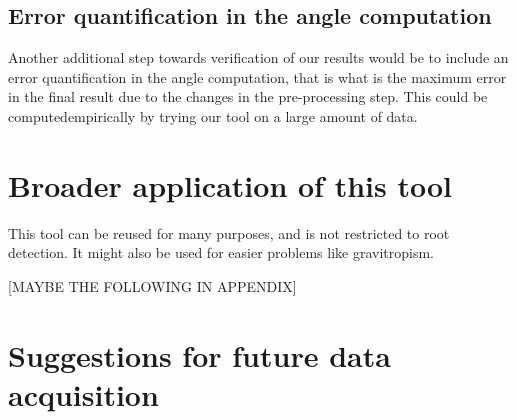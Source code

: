 %
%




\subsection{Error quantification in the angle computation}

Another additional step towards verification of our results would be to include an error quantification in the angle computation, that is what is the maximum error in the final result due to the changes in the pre-processing step. This could be computedempirically by trying our tool on a large amount of data.


\section{Broader application of this tool}

This tool can be reused for many purposes, and is not restricted to root detection.
It might also be used for easier problems like gravitropism.


[MAYBE THE FOLLOWING IN APPENDIX]

\section{Suggestions for future data acquisition}

